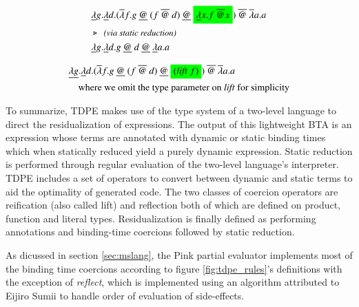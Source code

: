 \documentclass[a4paper,12pt,twoside,openright]{report}
\theoremstyle{definition}
\begin{document}
\begin{figure}[htp!]
    \begin{align}
        & \underline{\lambda}g.\underline{\lambda} d.(\overline{\lambda}f.g \: \underline{@} \: (f \: \overline{@} \: d) \: \underline{@} \: \text{\colorbox{green}{$\underline{\lambda} x.f \: \overline{@} x$}}) \: \overline{@} \: \overline{\lambda} a.a \label{eq:tdpe_ex3a} \\
        & \triangleright \:\: \emph{\small{\text{(via static reduction)}}} \nonumber \\
        & \underline{\lambda}g.\underline{\lambda} d.g \: \underline{@} \: d \: \underline{@} \: \underline{\lambda} a.a \label{eq:tdpe_ex3b}
    \end{align}
\end{figure}

\begin{figure}[htp!]
    \begin{align}
        & \underline{\lambda g}.\underline{\lambda} d.(\overline{\lambda}f.g \: \underline{@} \: (f \: \overline{@} \: d) \: \underline{@} \: \text{\colorbox{green}{(\textit{lift} $f$)}}) \: \overline{@} \: \overline{\lambda} a.a \label{eq:tdpe_ex4} \\
        & \quad \text{where we omit the type parameter on \textit{lift} for simplicity} \nonumber
    \end{align}
\end{figure}

To summarize, TDPE makes use of the type system of a two-level language to direct the residualization of expressions. The output of this lightweight BTA is an expression whose terms are annotated with dynamic or static binding times which when statically reduced yield a purely dynamic expression. Static reduction is performed through regular evaluation of the two-level language's interpreter. TDPE includes a set of operators to convert between dynamic and static terms to aid the optimality of generated code. The two classes of coercion operators are reification (also called lift) and reflection both of which are defined on product, function and literal types. Residualization is finally defined as performing annotations and binding-time coercions followed by static reduction.

As dicussed in section \ref{sec:mslang}, the Pink \cite{amin2017collapsing} partial evaluator implements most of the binding time coercions according to figure \ref{fig:tdpe_rules}'s definitions with the exception of \textit{reflect}, which is implemented using an algorithm attributed to Eijiro Sumii \cite{hatcliff2007partial} to handle order of evaluation of side-effects.
\end{document}
